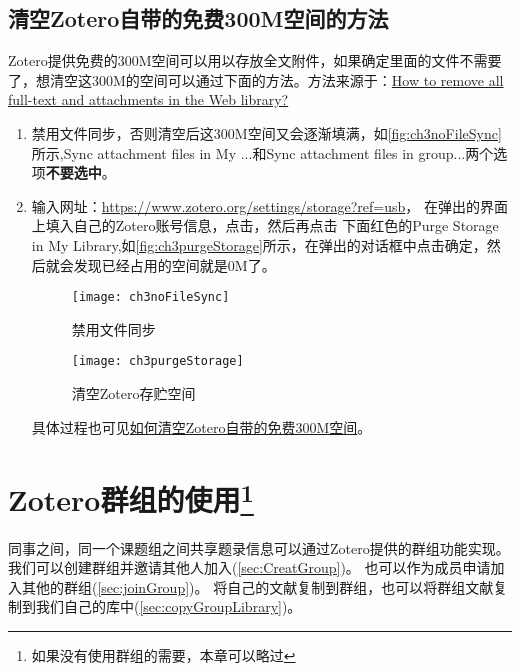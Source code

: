 \documentclass[theorem=false,mathfont=none,openany,sub3section]{easybook}
\begin{document}
\section{清空Zotero自带的免费300M空间的方法}\label{sec:Purge_space}

Zotero提供免费的300M空间可以用以存放全文附件，如果确定里面的文件不需要了，想清空这300M的空间可以通过下面的方法。方法来源于：\href{https://link.zhihu.com/?target=https%3A//forums.zotero.org/discussion/102110/how-to-remove-all-full-text-and-attachments-in-the-web-library}{How to remove all full-text and attachments in the Web library?} 
\begin{enumerate}
	\item 禁用文件同步，否则清空后这300M空间又会逐渐填满，如\autoref{fig:ch3noFileSync}所示,Sync attachment files in My ...和Sync attachment files in group...两个选项\textbf{不要选中}。
	\item 输入网址：\url{https://www.zotero.org/settings/storage?ref=usb}，
	在弹出的界面上填入自己的Zotero账号信息，点击，然后再点击 下面红色的Purge Storage in My Library,如\autoref{fig:ch3purgeStorage}所示，在弹出的对话框中点击确定，然后就会发现已经占用的空间就是0M了。
	\begin{figure}[htbp]
		\centering
		\texttt{[image: ch3noFileSync]}
		\caption{禁用文件同步}
		\label{fig:ch3noFileSync}
	\end{figure}
	
	\begin{figure}[htbp]
		\centering
		\texttt{[image: ch3purgeStorage]}
		\caption{清空Zotero存贮空间}
		\label{fig:ch3purgeStorage}
	\end{figure}
	具体过程也可见\href{https://zhuanlan.zhihu.com/p/596614249}{如何清空Zotero自带的免费300M空间}。
\end{enumerate}
	
\chapter[Zotero群组的使用]{Zotero群组的使用\footnote{如果没有使用群组的需要，本章可以略过}}\label{ch:group}
同事之间，同一个课题组之间共享题录信息可以通过Zotero提供的群组功能实现。
我们可以创建群组并邀请其他人加入(\cref{sec:CreatGroup})。
也可以作为成员申请加入其他的群组(\cref{sec:joinGroup})。
将自己的文献复制到群组，也可以将群组文献复制到我们自己的库中(\cref{sec:copyGroupLibrary})。
\end{document}
